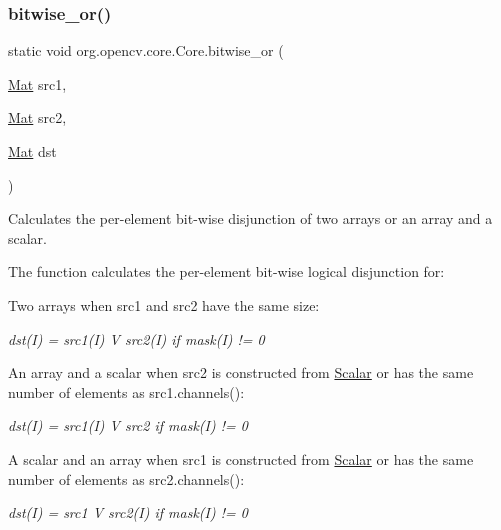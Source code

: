 \subsubsection{\texorpdfstring{bitwise\+\_\+or()}{bitwise\_or()}\hspace{0.1cm}{\footnotesize\ttfamily [2/2]}}
{\footnotesize\ttfamily static void org.\+opencv.\+core.\+Core.\+bitwise\+\_\+or (\begin{DoxyParamCaption}\item[{\mbox{\hyperlink{classorg_1_1opencv_1_1core_1_1_mat}{Mat}}}]{src1,  }\item[{\mbox{\hyperlink{classorg_1_1opencv_1_1core_1_1_mat}{Mat}}}]{src2,  }\item[{\mbox{\hyperlink{classorg_1_1opencv_1_1core_1_1_mat}{Mat}}}]{dst }\end{DoxyParamCaption})\hspace{0.3cm}{\ttfamily [static]}}

Calculates the per-\/element bit-\/wise disjunction of two arrays or an array and a scalar.

The function calculates the per-\/element bit-\/wise logical disjunction for\+:


\begin{DoxyItemize}
\item Two arrays when {\ttfamily src1} and {\ttfamily src2} have the same size\+: 
\end{DoxyItemize}

{\itshape dst(\+I) = src1(\+I) V src2(\+I) if mask(\+I) != 0}


\begin{DoxyItemize}
\item An array and a scalar when {\ttfamily src2} is constructed from {\ttfamily \mbox{\hyperlink{classorg_1_1opencv_1_1core_1_1_scalar}{Scalar}}} or has the same number of elements as {\ttfamily src1.\+channels()}\+: 
\end{DoxyItemize}

{\itshape dst(\+I) = src1(\+I) V src2 if mask(\+I) != 0}


\begin{DoxyItemize}
\item A scalar and an array when {\ttfamily src1} is constructed from {\ttfamily \mbox{\hyperlink{classorg_1_1opencv_1_1core_1_1_scalar}{Scalar}}} or has the same number of elements as {\ttfamily src2.\+channels()}\+: 
\end{DoxyItemize}

{\itshape dst(\+I) = src1 V src2(\+I) if mask(\+I) != 0}

